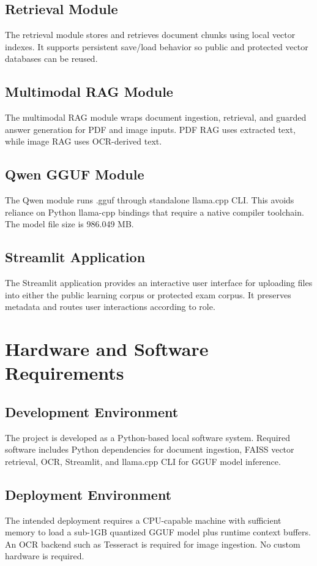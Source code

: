 \subsection{Retrieval Module}
The retrieval module stores and retrieves document chunks using local vector indexes. It supports persistent save/load behavior so public and protected vector databases can be reused.

\subsection{Multimodal RAG Module}
The multimodal RAG module wraps document ingestion, retrieval, and guarded answer generation for PDF and image inputs. PDF RAG uses extracted text, while image RAG uses OCR-derived text.

\subsection{Qwen GGUF Module}
The Qwen module runs \qwenmodel{}.gguf through standalone llama.cpp CLI. This avoids reliance on Python llama-cpp bindings that require a native compiler toolchain. The model file size is 986.049 MB.

\subsection{Streamlit Application}
The Streamlit application provides an interactive user interface for uploading files into either the public learning corpus or protected exam corpus. It preserves metadata and routes user interactions according to role.

\section{Hardware and Software Requirements}

\subsection{Development Environment}
The project is developed as a Python-based local software system. Required software includes Python dependencies for document ingestion, FAISS vector retrieval, OCR, Streamlit, and llama.cpp CLI for GGUF model inference.

\subsection{Deployment Environment}
The intended deployment requires a CPU-capable machine with sufficient memory to load a sub-1GB quantized GGUF model plus runtime context buffers. An OCR backend such as Tesseract is required for image ingestion. No custom hardware is required.

